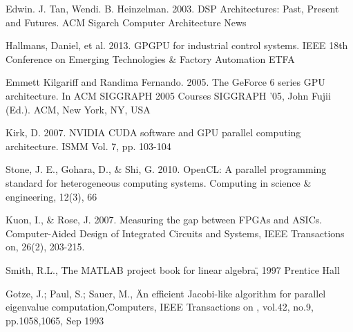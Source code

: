 \newpage
\pagestyle{plain}


\begin{thebibliography}{99}

 Edwin. J. Tan, Wendi. B. Heinzelman. 2003. DSP Architectures: Past, Present and Futures. ACM Sigarch Computer Architecture News

 Hallmans, Daniel, et al. 2013. GPGPU for industrial control systems. IEEE 18th Conference on Emerging Technologies \& Factory Automation ETFA

 Emmett Kilgariff and Randima Fernando. 2005. The GeForce 6 series GPU architecture. In ACM SIGGRAPH 2005 Courses SIGGRAPH '05, John Fujii (Ed.). ACM, New York, NY, USA

 Kirk, D. 2007. NVIDIA CUDA software and GPU parallel computing architecture. ISMM Vol. 7, pp. 103-104

 Stone, J. E., Gohara, D., \& Shi, G. 2010. OpenCL: A parallel programming standard for heterogeneous computing systems. Computing in science \& engineering, 12(3), 66

 Kuon, I., \& Rose, J. 2007. Measuring the gap between FPGAs and ASICs. Computer-Aided Design of Integrated Circuits and Systems, IEEE Transactions on, 26(2), 203-215.

Smith, R.L., \"The MATLAB project book for linear algebra\", 1997 Prentice Hall

 Gotze, J.; Paul, S.; Sauer, M., \"An efficient Jacobi-like algorithm for parallel eigenvalue computation,\" Computers, IEEE Transactions on , vol.42, no.9, pp.1058,1065, Sep 1993

\end{thebibliography}